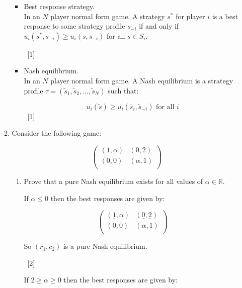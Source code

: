 \documentclass[12pt,a4paper]{article}
\begin{document}
\begin{enumerate}
\begin{enumerate}
\begin{itemize}
                \item Best response strategy.\\

                In an $N$ player normal form game. A strategy $s^*$ for player $i$ is a best response to some strategy profile $s_{-i}$ if and only if $u_i(s^*,s_{-i})\geq u_{i}(s,s_{-i})$ for all $s\in S_i$.

                ~\hfill{[1]}

                \item Nash equilibrium.\\

                In an $N$ player normal form game. A Nash equilibrium is a strategy profile $\tau = (\tilde s_1,\tilde s_2,\dots,\tilde s_N)$ such that:

                $$u_i(\tilde s)\geq u_i(\bar s_i,\tilde s_{-i})\text{ for all }i$$
                ~\hfill{[1]}
            \end{itemize}

        \item     Consider the following game:

            \[\begin{pmatrix}
            (1,\alpha) & (0,2)\\
            (0,0) & (\alpha,1)\\
            \end{pmatrix}\]

            \begin{enumerate}
            \item Prove that a pure Nash equilibrium exists for all values of
                \(\alpha \in \mathbb{R}\).

                If \(\alpha\leq 0\) then the best responses are given by:

                    \[\begin{pmatrix}
                        (\underline{1},\alpha) & (\underline{0},\underline{2})\\
                        (0,0) & (\alpha,\underline{1})\\
                    \end{pmatrix}\]

                So \((r_1, c_2)\) is a pure Nash equilibrium.

            ~\hfill{[2]}

                If \(2\geq\alpha\geq 0\) then the best responses are given by:


\end{enumerate}
\end{enumerate}
\end{enumerate}
\end{document}
